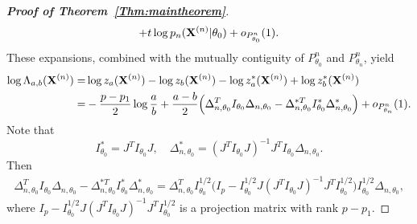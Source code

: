 \documentclass[3p]{elsarticle}
\theoremstyle{plain}
\theoremstyle{definition}
\theoremstyle{remark}
\begin{document}
\begin{proof}[\textbf{Proof of Theorem~\ref{Thm:maintheorem}}]
$$\begin{aligned}
            +
            t\log p_n(\mathbf{X}^{(n)}|\theta_0)
            +o_{P^n_{\theta_0}}(1).
\end{aligned}
$$
These expansions, combined with the mutually contiguity of $P_{\theta_0}^n$ and $P^n_{\theta_n}$, yield
        $$
        \begin{aligned}
        \log \Lambda_{a,b}(\mathbf{X}^{(n)})
            =&
            \log z_a(\mathbf{X}^{(n)})-
            \log z_b(\mathbf{X}^{(n)})
            -
            \log z^*_a(\mathbf{X}^{(n)})+
            \log z^*_b(\mathbf{X}^{(n)})\\
            =&
            -\frac{p-p_1}{2}\log \frac{a}{b}
            +
            \frac{a-b}{2}\Big(
            \Delta_{n,\theta_0}^T I_{\theta_0} \Delta_{n,\theta_0}
            -
            \Delta_{n,\theta_0}^{*T} I^*_{\theta_0} \Delta^*_{n,\theta_0}
            \Big)
            +o_{P^n_{\theta_n}}(1).
        \end{aligned}
        $$
Note that
$$
I_{\theta_0}^*= J^T I_{\theta_0}J, \quad \Delta_{n,\theta_0}^*=(J^T I_{\theta_0}J)^{-1} J^T I_{\theta_0} \Delta_{n,\theta_0}.
$$
Then
$$
\begin{aligned}
            \Delta_{n,\theta_0}^T I_{\theta_0} \Delta_{n,\theta_0}
            -
            \Delta_{n,\theta_0}^{*T} I^*_{\theta_0} \Delta^*_{n,\theta_0}
            =
            \Delta_{n,\theta_0}^T I_{\theta_0}^{1/2}\big(
            I_p-
            I_{\theta_0}^{1/2} J (J^T I_{\theta_0} J)^{-1} J^T I_{\theta_0}^{1/2}
            \big)I_{\theta_0}^{1/2}\Delta_{n,\theta_0},
\end{aligned}
$$
where $
            I_p-
            I_{\theta_0}^{1/2} J (J^T I_{\theta_0} J)^{-1} J^T I_{\theta_0}^{1/2}
$
is a projection matrix with rank $p-p_1$.


\end{proof}
\end{document}
